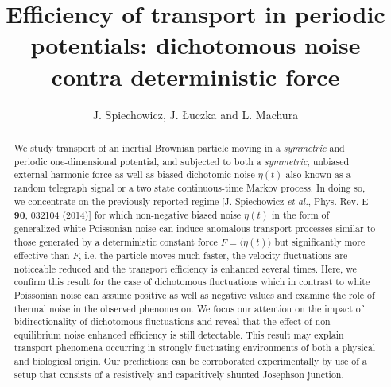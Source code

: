 \documentclass[12pt]{iopart}
\begin{document}
\title[Efficiency of transport in periodic potentials]{Efficiency of transport in periodic potentials:  dichotomous noise contra deterministic force}
\author{J. Spiechowicz,  J. {\L}uczka and L. Machura}
\address{Institute of Physics, University of Silesia, 40-007  Katowice, Poland}
\address{Silesian Center for Education and Interdisciplinary Research,\\ University of Silesia, 41-500 Chorz{\'o}w, Poland}


\begin{abstract}
We study transport of an inertial Brownian particle moving in a \emph{symmetric} and periodic one-dimensional potential,  and subjected to both a \emph{symmetric}, unbiased external harmonic force as well as  biased dichotomic noise $\eta(t)$ also known as a random telegraph signal or a two state continuous-time Markov process. In doing so, we concentrate on the previously reported regime [J. Spiechowicz \textit{et al.}, Phys. Rev. E \textbf{90}, 032104 (2014)] for which non-negative biased noise $\eta(t)$ in the form of generalized white Poissonian noise can induce anomalous transport processes similar to those generated by a deterministic constant force $F=\langle \eta(t) \rangle $ but significantly more effective than $F$, i.e. the particle moves much faster, the velocity fluctuations are noticeable reduced and the transport efficiency is enhanced several times. Here, we confirm this result for the case of dichotomous fluctuations which in contrast to white Poissonian noise can assume positive as well as negative values and examine the role of thermal noise in the observed phenomenon. We focus our attention on the impact of  bidirectionality of dichotomous fluctuations and reveal that  the effect of non-equilibrium noise enhanced efficiency is still detectable. This result may explain transport phenomena occurring in strongly fluctuating environments of both a  physical and biological origin. Our predictions can be corroborated experimentally by use of a setup that consists of a resistively and capacitively shunted Josephson junction.
\end{abstract}


\maketitle
\end{document}
